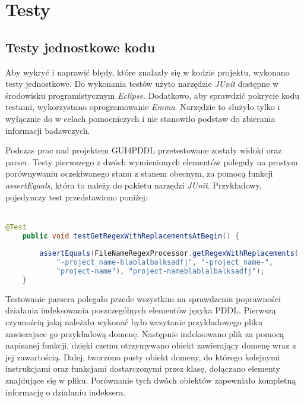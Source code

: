 \chapter{Testy}
\section{Testy jednostkowe kodu}
Aby wykryć i naprawić błędy, które znalazły się w kodzie projektu, wykonano testy jednostkowe. Do wykonania testów użyto narzędzie \textit{JUnit }dostępne w środowisku programistycznym \textit{Eclipse}. Dodatkowo, aby sprawdzić pokrycie kodu testami, wykorzystano oprogramowanie \textit{Emma}. Narzędzie to służyło tylko i wyłącznie do w celach pomocniczych i nie stanowiło podstaw do zbierania informacji badawczych.

Podczas prac nad projektem GUI4PDDL przetestowane zostały widoki oraz parser. Testy pierwszego z dwóch wymienionych elementów polegały na prostym porównywaniu oczekiwanego stanu z stanem obecnym, za pomocą funkcji \textit{assertEquals}, która to należy do pakietu narzędzi \textit{JUnit}. Przykładowy, pojedynczy test przedstawiono  poniżej:\\\\
\begin{Code}
\begin{lstlisting}[language=JAVA,frame=single,label=ana_code, caption=Przykładowy test jedostkowy]
	@Test
	public void testGetRegexWithReplacementsAtBegin() {
		
		assertEquals(FileNameRegexProcessor.getRegexWithReplacements(
			"-project_name-blablalbalksadfj", "-project_name-", 
			"project-name"), "project-nameblablalbalksadfj");
	}
\end{lstlisting}
\end{Code}

Testowanie parsera polegało przede wszystkim na sprawdzeniu poprawności działania indeksowania poszczególnych elementów języka PDDL. Pierwszą czynnością jaką należało wykonać było wczytanie przykładowego pliku zawierajace go przykładową domenę. Następnie indeksowano plik za pomocą napisanej funkcji, dzięki czemu otrzymywano obiekt zawierający domenę wraz z jej zawartością. Dalej, tworzono pusty obiekt domeny, do którego kolejnymi instrukcjami oraz funkcjami dostarczonymi przez klasę, dołączano elementy znajdujące się w pliku. Porównanie tych dwóch obiektów zapewniało kompletną informację o działaniu indeksera.

